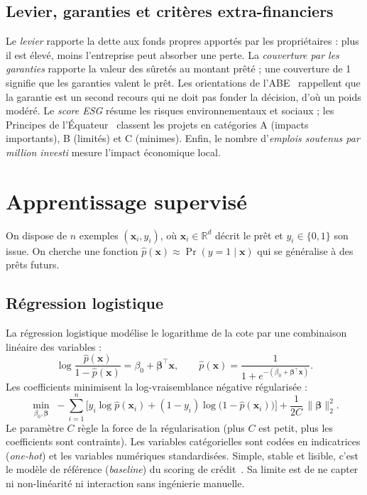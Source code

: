 \subsection{Levier, garanties et critères extra-financiers}

Le \emph{levier} rapporte la dette aux fonds propres apportés par les propriétaires : plus il est élevé, moins
l'entreprise peut absorber une perte. La \emph{couverture par les garanties} rapporte la valeur des sûretés au
montant prêté ; une couverture de 1 signifie que les garanties valent le prêt. Les orientations de
l'ABE~\cite{eba2020} rappellent que la garantie est un second recours qui ne doit pas fonder la décision, d'où un
poids modéré. Le \emph{score ESG} résume les risques environnementaux et sociaux ; les Principes de
l'Équateur~\cite{equator2020} classent les projets en catégories A (impacts importants), B (limités) et C (minimes).
Enfin, le nombre d'\emph{emplois soutenus par million investi} mesure l'impact économique local.

\section{Apprentissage supervisé}

On dispose de $n$ exemples $(\bm{x}_i, y_i)$, où $\bm{x}_i \in \mathbb{R}^d$ décrit le prêt et $y_i \in \{0,1\}$
son issue. On cherche une fonction $\hat p(\bm{x}) \approx \Pr(y = 1 \mid \bm{x})$ qui se généralise à des prêts
futurs.

\subsection{Régression logistique}

La régression logistique modélise le logarithme de la cote par une combinaison linéaire des variables :
\begin{equation}
  \log \frac{\hat p(\bm{x})}{1-\hat p(\bm{x})} = \beta_0 + \bm{\beta}^\top \bm{x},
  \qquad \hat p(\bm{x}) = \frac{1}{1+e^{-(\beta_0 + \bm{\beta}^\top \bm{x})}}.
\end{equation}
Les coefficients minimisent la log-vraisemblance négative régularisée :
\begin{equation}
  \min_{\beta_0,\bm{\beta}} \; -\sum_{i=1}^{n} \Big[ y_i \log \hat p(\bm{x}_i) + (1-y_i)\log\big(1-\hat p(\bm{x}_i)\big) \Big]
  + \frac{1}{2C}\,\|\bm{\beta}\|_2^2 .
\end{equation}
Le paramètre $C$ règle la force de la régularisation (plus $C$ est petit, plus les coefficients sont contraints). Les
variables catégorielles sont codées en indicatrices (\textit{one-hot}) et les variables numériques standardisées.
Simple, stable et lisible, c'est le modèle de référence (\textit{baseline}) du scoring de crédit~\cite{thomas2002}.
Sa limite est de ne capter ni non-linéarité ni interaction sans ingénierie manuelle.

